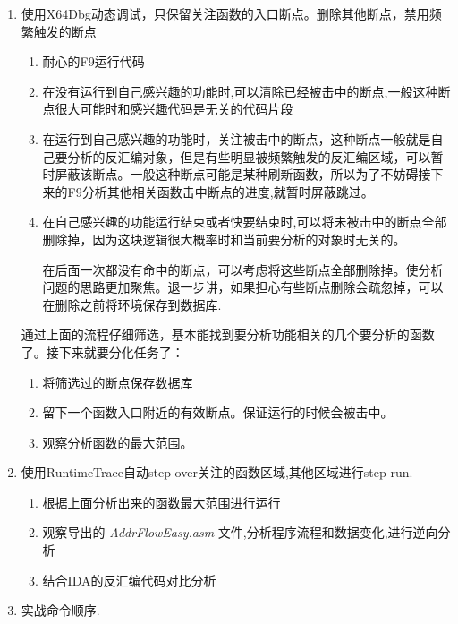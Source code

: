 \documentclass[AutoFakeBold,AutoFakeSlant]{article}
\begin{document}
\begin{flushleft}
\begin{enumerate}
			\item 使用X64Dbg动态调试，只保留关注函数的入口断点。删除其他断点，禁用频繁触发的断点
				{
					\small
					\begin{enumerate}
						\item 耐心的F9运行代码
						\item 在没有运行到自己感兴趣的功能时,可以清除已经被击中的断点,一般这种断点很大可能时和感兴趣代码是无关的代码片段
						\item 在运行到自己感兴趣的功能时，关注被击中的断点，这种断点一般就是自己要分析的反汇编对象，但是有些明显被频繁触发的反汇编区域，可以暂时屏蔽该断点。一般这种断点可能是某种刷新函数，所以为了不妨碍接下来的F9分析其他相关函数击中断点的进度,就暂时屏蔽跳过。
						\item 在自己感兴趣的功能运行结束或者快要结束时,可以将未被击中的断点全部删除掉，因为这块逻辑很大概率时和当前要分析的对象时无关的。
						\begin{flushleft}
							\begin{figure}[htbp]
								\centering
							\end{figure}
							在后面一次都没有命中的断点，可以考虑将这些断点全部删除掉。使分析问题的思路更加聚焦。退一步讲，如果担心有些断点删除会疏忽掉，可以在删除之前将环境保存到数据库.
						\end{flushleft}
					\end{enumerate}
					通过上面的流程仔细筛选，基本能找到要分析功能相关的几个要分析的函数了。接下来就要分化任务了：
					\begin{enumerate}
						\item 将筛选过的断点保存数据库
						\item 留下一个函数入口附近的有效断点。保证运行的时候会被击中。
						\item 观察分析函数的最大范围。
					\end{enumerate}
				}
			\item 使用RuntimeTrace自动step over关注的函数区域,其他区域进行step run.
				{
					\small
					\begin{enumerate}
						\item 根据上面分析出来的函数最大范围进行运行
						\item 观察导出的 \textit{AddrFlowEasy.asm} 文件,分析程序流程和数据变化,进行逆向分析
						\item 结合IDA的反汇编代码对比分析
					\end{enumerate}
				}
			\item 实战命令顺序.
				{
					
}
\end{enumerate}
\end{flushleft}
\end{document}
